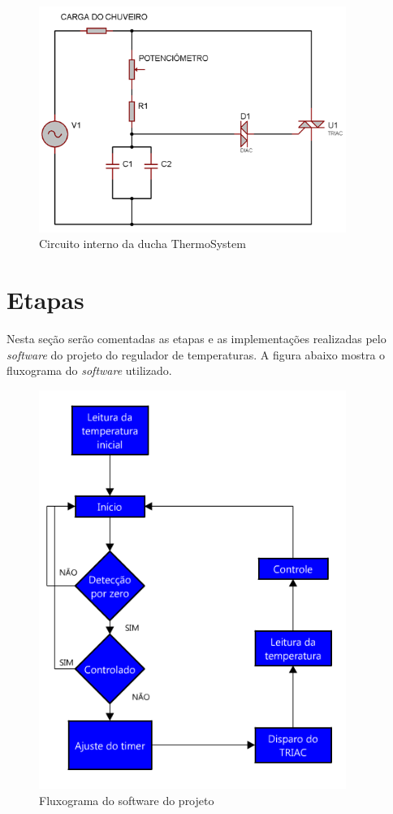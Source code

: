 \begin{figure}[!htb]

\center

\includegraphics[width=10cm]{imagens/circuito_thermosystem.png}

\label{Circuito interno da ducha ThermoSystem}

\caption{Circuito interno da ducha ThermoSystem}

\end{figure}


\section{Etapas}
Nesta seção serão comentadas as etapas e as implementações realizadas pelo \textit{software} do projeto do regulador de temperaturas. A figura abaixo mostra o fluxograma do \textit{software} utilizado.


\begin{figure}[!htb]

\center

\includegraphics[width=10cm]{imagens/fluxograma_melhor.png}

\label{Fluxograma do software do projeto}

\caption{Fluxograma do software do projeto}

\end{figure}

